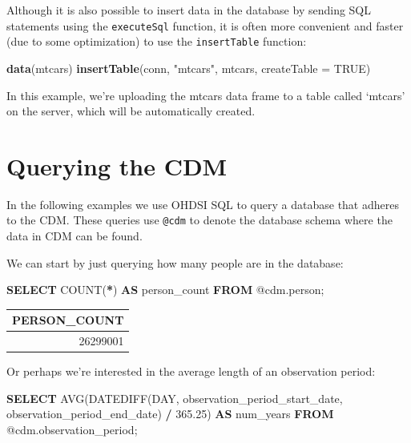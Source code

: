 \documentclass[11pt]{book}
\newenvironment{Shaded}{\begin{snugshade}}{\end{snugshade}}
\newcommand{\DataTypeTok}[1]{\textcolor[rgb]{0.13,0.29,0.53}{#1}}
\newcommand{\FloatTok}[1]{\textcolor[rgb]{0.00,0.00,0.81}{#1}}
\newcommand{\FunctionTok}[1]{\textcolor[rgb]{0.00,0.00,0.00}{#1}}
\newcommand{\KeywordTok}[1]{\textcolor[rgb]{0.13,0.29,0.53}{\textbf{#1}}}
\newcommand{\NormalTok}[1]{#1}
\newcommand{\OperatorTok}[1]{\textcolor[rgb]{0.81,0.36,0.00}{\textbf{#1}}}
\newcommand{\OtherTok}[1]{\textcolor[rgb]{0.56,0.35,0.01}{#1}}
\newcommand{\StringTok}[1]{\textcolor[rgb]{0.31,0.60,0.02}{#1}}
\theoremstyle{definition}
\theoremstyle{definition}
\theoremstyle{definition}
\theoremstyle{remark}
\begin{document}
Although it is also possible to insert data in the database by sending SQL statements using the \texttt{executeSql} function, it is often more convenient and faster (due to some optimization) to use the \texttt{insertTable} function:

\begin{Shaded}
\begin{Highlighting}[]
\KeywordTok{data}\NormalTok{(mtcars)}
\KeywordTok{insertTable}\NormalTok{(conn, }\StringTok{"mtcars"}\NormalTok{, mtcars, }\DataTypeTok{createTable =} \OtherTok{TRUE}\NormalTok{)}
\end{Highlighting}
\end{Shaded}

In this example, we're uploading the mtcars data frame to a table called `mtcars' on the server, which will be automatically created.

\hypertarget{QueryTheCdm}{%
\section{Querying the CDM}\label{QueryTheCdm}}

In the following examples we use OHDSI SQL to query a database that adheres to the CDM. These queries use \texttt{@cdm} to denote the database schema where the data in CDM can be found.

We can start by just querying how many people are in the database:

\begin{Shaded}
\begin{Highlighting}[]
\KeywordTok{SELECT} \FunctionTok{COUNT}\NormalTok{(}\OperatorTok{*}\NormalTok{) }\KeywordTok{AS}\NormalTok{ person_count }\KeywordTok{FROM}\NormalTok{ @cdm.person;}
\end{Highlighting}
\end{Shaded}

\begin{longtable}[]{@{}r@{}}
\toprule
PERSON\_COUNT\tabularnewline
\midrule
\endhead
26299001\tabularnewline
\bottomrule
\end{longtable}

Or perhaps we're interested in the average length of an observation period:

\begin{Shaded}
\begin{Highlighting}[]
\KeywordTok{SELECT} \FunctionTok{AVG}\NormalTok{(DATEDIFF(}\DataTypeTok{DAY}\NormalTok{, }
\NormalTok{                    observation_period_start_date, }
\NormalTok{                    observation_period_end_date) }\OperatorTok{/} \FloatTok{365.25}\NormalTok{) }\KeywordTok{AS}\NormalTok{ num_years}
\KeywordTok{FROM}\NormalTok{ @cdm.observation_period;}
\end{Highlighting}
\end{Shaded}
\end{document}

